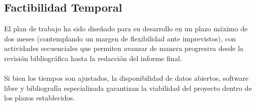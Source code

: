 \subsection{Factibilidad Temporal}
El plan de trabajo ha sido diseñado para su desarrollo en un plazo máximo de dos meses (contemplando un margen de flexibilidad ante imprevistos), con actividades secuenciales que permiten avanzar de manera progresiva desde la revisión bibliográfica hasta la redacción del informe final. \\  \\ Si bien los tiempos son ajustados, la disponibilidad de datos abiertos, software libre y bibliografía especializada garantizan la viabilidad del proyecto dentro de los plazos establecidos.